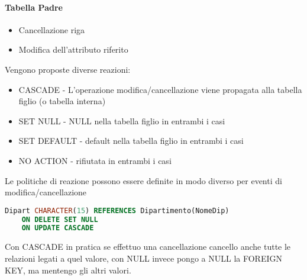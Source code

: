 \paragraph*{Tabella Padre}
\begin{itemize}
  \item Cancellazione riga
  \item Modifica dell'attributo riferito
\end{itemize}
Vengono proposte diverse reazioni:
\begin{itemize}
  \item CASCADE - L'operazione modifica/cancellazione viene propagata alla tabella figlio (o tabella interna)
  \item SET NULL - NULL nella tabella figlio in entrambi i casi
  \item SET DEFAULT - default nella tabella figlio in entrambi i casi
  \item NO ACTION - rifiutata in entrambi i casi
\end{itemize}
Le politiche di reazione possono essere definite in modo diverso per eventi di modifica/cancellazione
\begin{lstlisting}[language=SQL]
  Dipart CHARACTER(15) REFERENCES Dipartimento(NomeDip)
    ON DELETE SET NULL
    ON UPDATE CASCADE
\end{lstlisting}
Con CASCADE in pratica se effettuo una cancellazione cancello anche tutte le relazioni legati a quel valore,
con NULL invece pongo a NULL la FOREIGN KEY, ma mentengo gli altri valori.